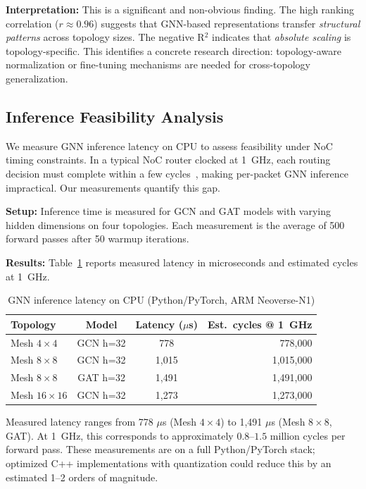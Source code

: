 \documentclass[conference]{IEEEtran}
\begin{document}
\textbf{Interpretation:} This is a significant and non-obvious finding. The high ranking correlation ($r \approx 0.96$) suggests that GNN-based representations transfer \emph{structural patterns} across topology sizes. The negative R$^2$ indicates that \emph{absolute scaling} is topology-specific. This identifies a concrete research direction: topology-aware normalization or fine-tuning mechanisms are needed for cross-topology generalization.

\subsection{Inference Feasibility Analysis}
\label{sec:results-latency}

We measure GNN inference latency on CPU to assess feasibility under NoC timing constraints. In a typical NoC router clocked at 1~GHz, each routing decision must complete within a few cycles~\cite{wang2022maar}, making per-packet GNN inference impractical. Our measurements quantify this gap.

\textbf{Setup:} Inference time is measured for GCN and GAT models with varying hidden dimensions on four topologies. Each measurement is the average of 500 forward passes after 50 warmup iterations.

\textbf{Results:} Table~\ref{tab:latency} reports measured latency in microseconds and estimated cycles at 1~GHz.

\begin{table}[h]
\centering
\caption{GNN inference latency on CPU (Python/PyTorch, ARM Neoverse-N1)}
\label{tab:latency}
\small
\begin{tabular}{lccr}
\toprule
\textbf{Topology} & \textbf{Model} & \textbf{Latency ($\mu$s)} & \textbf{Est.~cycles @ 1~GHz} \\
\midrule
Mesh $4\times4$ & GCN h=32 & 778 & 778,000 \\
Mesh $8\times8$ & GCN h=32 & 1,015 & 1,015,000 \\
Mesh $8\times8$ & GAT h=32 & 1,491 & 1,491,000 \\
Mesh $16\times16$ & GCN h=32 & 1,273 & 1,273,000 \\
\bottomrule
\end{tabular}
\end{table}

Measured latency ranges from 778 $\mu$s (Mesh $4\times4$) to 1,491 $\mu$s (Mesh $8\times8$, GAT). At 1~GHz, this corresponds to approximately $0.8$--$1.5$ million cycles per forward pass. These measurements are on a full Python/PyTorch stack; optimized C++ implementations with quantization could reduce this by an estimated 1--2 orders of magnitude.
\end{document}
